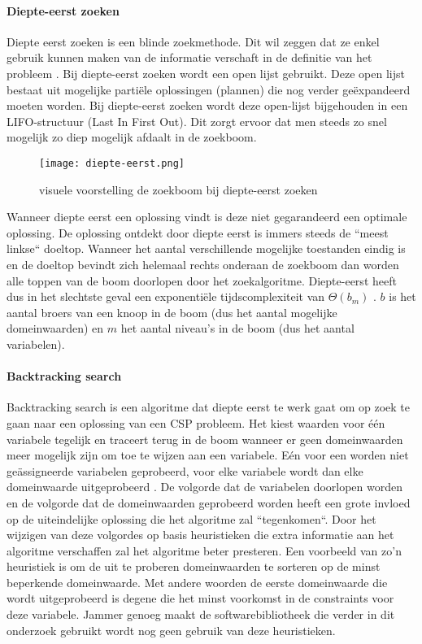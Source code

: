 \paragraph{Diepte-eerst zoeken}
Diepte eerst zoeken is een blinde zoekmethode. Dit wil zeggen dat ze enkel gebruik kunnen maken van de informatie verschaft in de definitie van het probleem \autocite{lievens}. Bij diepte-eerst zoeken wordt een open lijst gebruikt. Deze open lijst bestaat uit mogelijke partiële oplossingen (plannen) die nog verder geëxpandeerd moeten worden. Bij diepte-eerst zoeken wordt deze open-lijst bijgehouden in een LIFO-structuur (Last In First Out). Dit zorgt ervoor dat men steeds zo snel mogelijk zo diep mogelijk afdaalt in de zoekboom. \begin{figure}[h]
	\texttt{[image: diepte-eerst.png]}
	\caption{visuele voorstelling de zoekboom bij diepte-eerst zoeken}
\end{figure}
Wanneer diepte eerst een oplossing vindt is deze niet gegarandeerd een optimale oplossing. De oplossing ontdekt door diepte eerst is immers steeds de ``meest linkse`` doeltop. Wanneer het aantal verschillende mogelijke toestanden eindig is en de doeltop bevindt zich helemaal rechts onderaan de zoekboom dan worden alle toppen van de boom doorlopen door het zoekalgoritme. Diepte-eerst heeft dus in het slechtste geval een exponentiële tijdscomplexiteit van $\Theta(b_{m})$ \autocite{lievens}. $b$ is het aantal broers van een knoop in de boom (dus het aantal mogelijke domeinwaarden) en $m$ het aantal niveau's in de boom (dus het aantal variabelen).

\paragraph{Backtracking search}
Backtracking search is een algoritme dat diepte eerst te werk gaat om op zoek te gaan naar een oplossing van een CSP probleem. Het kiest waarden voor één variabele tegelijk en traceert terug in de boom wanneer er geen domeinwaarden meer mogelijk zijn om toe te wijzen aan een variabele. Eén voor een worden niet geässigneerde variabelen geprobeerd, voor elke variabele wordt dan elke domeinwaarde uitgeprobeerd \autocite{norvig}. De volgorde dat de variabelen doorlopen worden en de volgorde dat de domeinwaarden geprobeerd worden heeft een grote invloed op de uiteindelijke oplossing die het algoritme zal ``tegenkomen``. Door het wijzigen van deze volgordes op basis heuristieken  die extra informatie aan het algoritme verschaffen zal het algoritme beter presteren. Een voorbeeld van zo'n heuristiek is om de uit te proberen domeinwaarden te sorteren op de minst beperkende domeinwaarde. Met andere woorden de eerste domeinwaarde die wordt uitgeprobeerd is degene die het minst voorkomst in de constraints voor deze variabele. Jammer genoeg maakt de softwarebibliotheek die verder in dit onderzoek gebruikt wordt nog geen gebruik van deze heuristieken.

